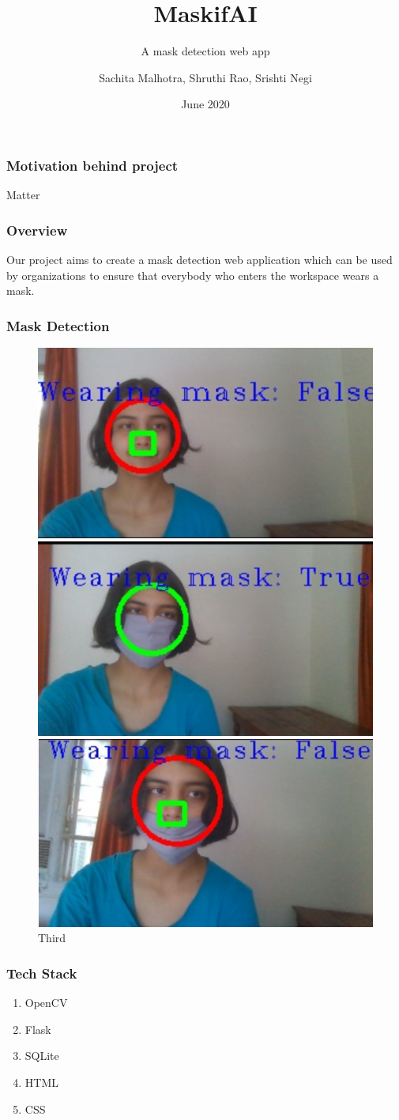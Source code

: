 \documentclass[14pt]{beamer}
\title{MaskifAI}
\subtitle{A mask detection web app}
\author[TEAM 6]{Sachita Malhotra, Shruthi Rao, Srishti Negi}
\date{June 2020}
\begin{document}
\begin{frame}
    \titlepage
\end{frame}

\begin{frame}
    \frametitle{Motivation behind project}
   Matter
\end{frame}

\begin{frame}
    \frametitle{Overview}
    Our project aims to create a mask detection web application which can be used by organizations to ensure that everybody who enters the workspace wears a mask.
\end{frame}

\begin{frame}
\frametitle{Mask Detection}
\begin {figure}
\begin{minipage}{0.5\textwidth}
\centering
\includegraphics[width=3.5 cm,height=2.5 cm]{a}
\caption{First}
\end{minipage}
\pause[2]
\begin{minipage}{0.5\textwidth}
\centering
\includegraphics[width=3.5 cm,height=2.5 cm]{b}
\caption{Second}
\end{minipage}%
\pause[3]%
\begin{minipage}{0.5\textwidth}
\centering
\includegraphics[width=3.5 cm,height=2.5 cm]{c}
\caption{Third}
\end{minipage}
\end{figure}
\end{frame}

\begin{frame}
    \frametitle{Tech Stack}
    \begin{enumerate}
        \item OpenCV
        \item Flask
        \item SQLite
        \item HTML
        \item CSS
    \end{enumerate}
\end{frame} 
\end{document}
